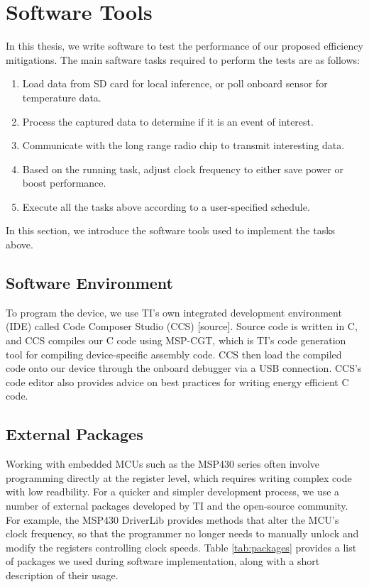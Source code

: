 \documentclass[twoside]{report}
\begin{document}
\section{Software Tools}
In this thesis, we write software to test the performance of our proposed efficiency mitigations. 
The main saftware tasks required to perform the tests are as follows:

\begin{enumerate}
    \item Load data from SD card for local inference, or poll onboard sensor for temperature data.
    \item Process the captured data to determine if it is an event of interest.
    \item Communicate with the long range radio chip to transmit interesting data.
    \item Based on the running task, adjust clock frequency to either save power or boost performance.
    \item Execute all the tasks above according to a user-specified schedule.
\end{enumerate}

In this section, we introduce the software tools used to implement the tasks above.

\subsection{Software Environment}
To program the device, we use TI's own integrated development environment (IDE) called 
Code Composer Studio (CCS) [source]. Source code is written in C, and CCS compiles our C code using MSP-CGT, 
which is TI's code generation tool for compiling device-specific assembly code. CCS then load the compiled code onto 
our device through the onboard debugger via a USB connection. CCS's code editor also provides advice 
on best practices for writing energy efficient C code.

\subsection{External Packages}
Working with embedded MCUs such as the MSP430 series often involve programming directly at the register level, 
which requires writing complex code with low readbility. 
For a quicker and simpler development process, we use a number of external packages developed by TI and 
the open-source community. For example, the MSP430 DriverLib provides methods that alter the MCU's clock frequency, 
so that the programmer no longer needs to manually unlock and modify the registers controlling clock speeds.
Table \ref{tab:packages} provides a list of packages we used during software 
implementation, along with a short description of their usage.
\end{document}
